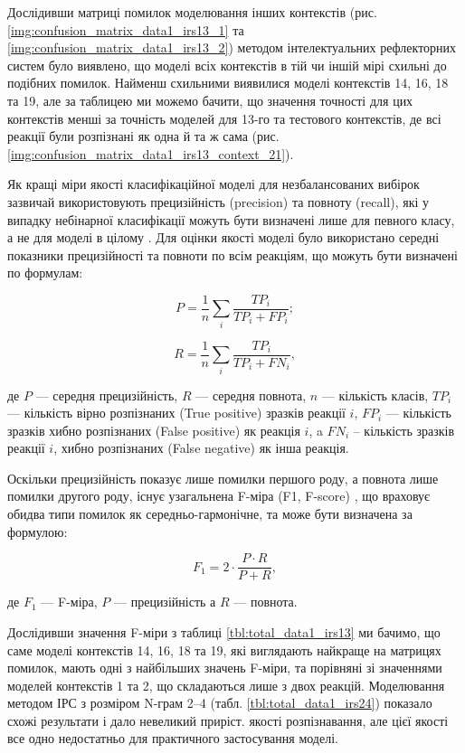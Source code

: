 Дослідивши матриці помилок моделювання інших контекстів (рис. \ref{img:confusion_matrix_data1_irs13_1} та \ref{img:confusion_matrix_data1_irs13_2}) методом інтелектуальних рефлекторних систем було виявлено, що моделі всіх контекстів в тій чи іншій мірі схильні до подібних помилок. Найменш схильними виявилися моделі контекстів 14, 16, 18 та 19, але за таблицею ми можемо бачити, що значення точності для цих контекстів менші за точність моделей для 13-го та тестового контекстів, де всі реакції були розпізнані як одна й та ж сама (рис. \ref{img:confusion_matrix_data1_irs13_context_21}).

Як кращі міри якості класифікаційної моделі для незбалансованих вибірок зазвичай використовують прецизійність (precision) та повноту (recall), які у випадку небінарної класифікації можуть бути визначені лише для певного класу, а не для моделі в цілому \cite{Powers_2011}. Для оцінки якості моделі було використано середні показники прецизійності та повноти по всім реакціям, що можуть бути визначені по формулам:

\begin{equation}
\label{eq:рrecision}
P=\frac{1}{n}\sum\limits_i\frac{TP_i}{TP_i+FP_i};
\end{equation}

\begin{equation}
\label{eq:recall}
R=\frac{1}{n}\sum\limits_i\frac{TP_i}{TP_i+FN_i},
\end{equation}

де $P$ --- середня прецизійність, $R$ --- середня повнота, $n$ --- кількість класів, $TP_i$ --- кількість вірно розпізнаних (True positive) зразків реакції $i$, $FP_i$ --- кількість зразків хибно розпізнаних (False positive) як реакція $i$, a $FN_i$ -- кількість зразків реакції $i$, хибно розпізнаних (False negative) як інша реакція.

Оскільки прецизійність показує лише помилки першого роду, а повнота лише помилки другого роду, існує узагальнена F-міра (F1, F-score) \cite{Powers_2011,Sasaki_2007}, що враховує обидва типи помилок як середньо-гармонічне, та може бути визначена за формулою:

\begin{equation}
\label{eq:f1}
F_1 = 2 \cdot \frac{P \cdot R}{P + R},
\end{equation}

де $F_1$ --- F-міра, $P$ --- прецизійність а $R$ --- повнота.

Дослідивши значення F-міри з таблиці \ref{tbl:total_data1_irs13} ми бачимо, що саме моделі контекстів 14, 16, 18 та 19, які виглядають найкраще на матрицях помилок, мають одні з найбільших значень F-міри, та порівняні зі значеннями моделей контекстів 1 та 2, що складаються лише з двох реакцій. Моделювання методом ІРС з розміром N-грам 2–4 (табл. \ref{tbl:total_data1_irs24}) показало схожі результати і дало невеликий приріст. якості розпізнавання, але цієї якості все одно недостатньо для практичного застосування моделі.

